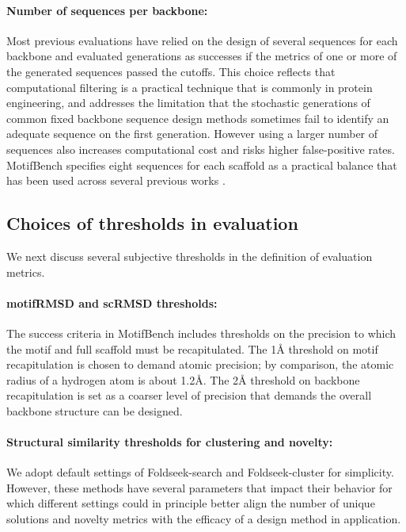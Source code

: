 \paragraph{Number of sequences per backbone:}
Most previous evaluations have relied on the design of several sequences for each backbone and evaluated generations as successes if the metrics of one or more of the generated sequences passed the cutoffs.
This choice reflects that computational filtering is a practical technique that is commonly in protein engineering,
and addresses the limitation that the stochastic generations of common fixed backbone sequence design methods sometimes fail to identify an adequate sequence on the first generation.
However using a larger number of sequences also increases computational cost and risks higher false-positive rates.
MotifBench specifies eight sequences for each scaffold as a practical balance that has been used across several previous works \citep{trippe2022diffusion,yim2023se,watson2022broadly}.

\subsection*{Choices of thresholds in evaluation}
We next discuss several subjective thresholds in the definition of evaluation metrics.

\paragraph{motifRMSD and scRMSD thresholds:}
The success criteria in MotifBench includes thresholds on the precision to which the motif and full scaffold must be recapitulated.
The 1{\AA} threshold on motif recapitulation is chosen to demand atomic precision;
by comparison, the atomic radius of a hydrogen atom is about 1.2{\AA}.
The 2{\AA} threshold on backbone recapitulation is set as a coarser level of precision that demands the overall backbone structure can be designed. 

\paragraph{Structural similarity thresholds for clustering and novelty:}
We adopt default settings of Foldseek-search and Foldseek-cluster for simplicity.
However, these methods have several parameters that impact their behavior for which different settings could in principle better align the number of unique solutions and novelty metrics with the efficacy of a design method in application.

